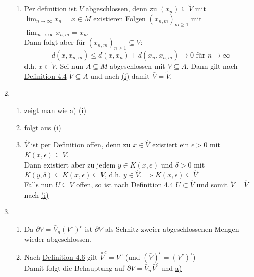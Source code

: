 \begin{prop}
\begin{beweis}
\begin{enumerate}[label=\alph*\upshape)]
\begin{enumerate}
					\item Per definition ist $\tilde V$ abgeschlossen, denn zu $(x_{n}) \subseteq \tilde V$ mit $\lim_{n \rightarrow \infty} x_{n} = x \in M$ existieren Folgen $(x_{n, m})_{m \geq 1}$ mit  $\lim_{m \rightarrow \infty} x_{n, m} = x_{n}$. \\
						Dann folgt aber für $(x_{n, m})_{n \geq 1} \subseteq V$:
						\[ d(x, x_{n, m}) \leq d(x, x_{n}) + d(x_{n}, x_{n, m}) \rightarrow 0 \text{ für } n \rightarrow \infty \]
						d.h. $x \in \tilde V$. Sei nun $A \subseteq M$ abgeschlossen mit $V \subseteq A$. Dann gilt nach \hyperref[def:1-4.4-abgoff]{Definition 4.4} $\tilde V \subseteq A$ und nach \hyperref[prop:1-4.8.a1]{(i)} damit $\bar V = \tilde V$.
				\end{enumerate} 
			\item 
				\begin{enumerate}
					\item zeigt man wie \hyperref[prop:1-4.8.a1-proof]{a) (i)}
					\item folgt aus \hyperref[prop:1-4.8.b1]{(i)}
					\item $\hat V$ ist per Definition offen, denn zu $x \in \hat V$ existiert ein $\epsilon > 0$ mit  $K(x, \epsilon) \subseteq V$. \\
						 Dann existiert aber zu jedem $y \in K(x, \epsilon)$ und $\delta > 0$ mit $K(y, \delta) \subseteq K(x, \epsilon) \subseteq V$, d.h. $y \in \hat V$. $\Rightarrow K(x, \epsilon) \subseteq \hat V$ \\
						 Falls nun $U \subseteq V$ offen, so ist nach \hyperref[def:1-4.4-abgoff]{Definition 4.4} $U \subset \hat V$ und somit $\mathring V = \hat V$ nach \hyperref[prop:1-4.8.b1]{(i)}
				\end{enumerate} 
			\item
				\begin{enumerate}
					\item Da $\partial V = \bar V_{n}(V^{\circ})^{c}$ ist $\partial V$ als Schnitz zweier abgeschlossenen Mengen wieder abgeschlossen.
					\item Nach \hyperref[def:1-4.7-abschinnrand]{Definition 4.6} gilt $\overset{\circ}{V}^{c} = \overline{V^{c}}$ \quad (und $\left( \bar V \right)^{c} = \left( V^{c} \right)^{\circ}$) \\
						Damit folgt die Behauptung auf $\partial V = \bar V_{n} \bar V^{c}$ und \hyperref[prop:1-4.8.a1]{a)}
				\end{enumerate} 
		\end{enumerate}	
	\end{beweis}
\end{prop}

